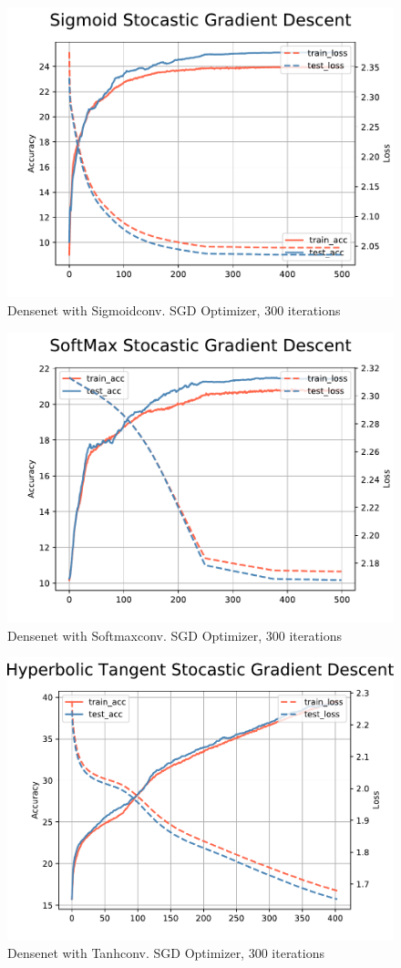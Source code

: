 \documentclass{article}
\begin{document}
\begin{figure}
        \centering
        \includegraphics[width=0.8\linewidth]{figures/SGD3k/sigmoid.pdf}
        \caption{Densenet with Sigmoidconv. SGD Optimizer, 300 iterations}
\end{figure}

\begin{figure}
        \centering
        \includegraphics[width=0.8\linewidth]{figures/SGD3k/softmax.pdf}
        \caption{Densenet with Softmaxconv. SGD Optimizer, 300 iterations}
\end{figure}

\begin{figure}
        \centering
        \includegraphics[width=0.8\linewidth]{figures/SGD3k/tanh.pdf}
        \caption{Densenet with Tanhconv. SGD Optimizer, 300 iterations}
\end{figure}
\end{document}
